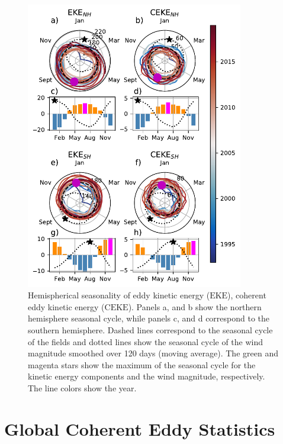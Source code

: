 \documentclass[draft,linenumbers]{agujournal2019}
\newcommand{\EKE}{\textrm{EKE}}
\newcommand{\CEKE}{\textrm{CEKE}}
\begin{document}
	\begin{figure}
	    \centering
	    \includegraphics[width=95mm]{figures/All_polar_plots.pdf}
	    \caption{Hemispherical seasonality of eddy kinetic energy ($\EKE$), coherent eddy kinetic energy ($\CEKE$). 
		Panels a, and b show the northern hemisphere seasonal cycle, while panels c, and d correspond to the southern hemisphere. Dashed lines correspond to the seasonal cycle of the fields and dotted lines show the seasonal cycle of the wind magnitude smoothed over 120 days (moving average). 
		The green and magenta stars show the maximum of the seasonal cycle for the kinetic energy components and the wind magnitude, respectively. The line colors show the year.}
	    \label{fig:eddy_energy_polar}
	\end{figure}
	
	\section{Global Coherent Eddy Statistics}
	\label{sec:CE_stats}
\end{document}
